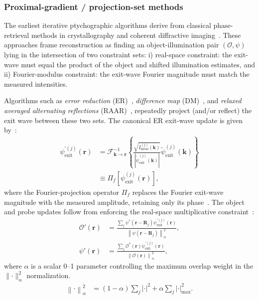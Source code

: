 \documentclass[pdflatex,sn-aps,iicol]{sn-jnl}%
\begin{document}
\subsubsection*{Proximal-gradient / projection-set methods}
\label{sec:projection-methods}

The earliest iterative ptychographic algorithms derive from classical phase-retrieval methods in crystallography and coherent diffractive imaging~\cite{karle1985,Fienup_1982,Levi_1984,Miao_1999,Bauschke_2002,Elser_2003,Thibault_2008}.
These approaches frame reconstruction as finding an object-illumination pair $(\mathcal{O},\psi)$ lying in the intersection of two constraint sets: i) real-space constraint: the exit-wave must equal the product of the object and shifted illumination estimates, and ii) Fourier-modulus constraint: the exit-wave Fourier magnitude must match the measured intensities.

Algorithms such as \emph{error reduction} (ER)~\cite{Levi_1984}, \emph{difference map} (DM)~\cite{Elser_2003,Thibault_2008}, and \emph{relaxed averaged alternating reflections} (RAAR)~\cite{Luke_2004}, repeatedly project (and/or reflect) the exit wave between these two sets.
The canonical ER exit-wave update is given by~\cite{Bauschke_2002}:
\begin{align}
\psi_{\text{exit}}^{'(j)}(\boldsymbol{r})
&=
\mathcal{F}_{\boldsymbol{k}\to\boldsymbol{r}}^{-1}
\left\{
\frac{\sqrt{I_{\text{meas}}^{(j)}(\boldsymbol{k})}}
{\left\lvert \tilde{\psi}_{\text{exit}}^{(j)}(\boldsymbol{k}) \right\rvert}
\tilde{\psi}_{\text{exit}}^{(j)}(\boldsymbol{k})
\right\}
\nonumber\\
&\equiv
\Pi_f\!\left[\psi_{\text{exit}}^{(j)}(\boldsymbol{r})\right],
\label{eq:proj-exit-wave}
\end{align}
where the Fourier-projection operator $\Pi_f$ replaces the Fourier exit-wave magnitude with the measured amplitude, retaining only its phase~\cite{Fienup_1982,Bauschke_2002}.
The object and probe updates follow from enforcing the real-space multiplicative constraint~\cite{Thibault_2008}:
\begin{align}
\mathcal{O}'(\boldsymbol{r})
&=
\frac{
\sum_j
\psi^{*}(\boldsymbol{r}-\boldsymbol{R}_j)
\psi_{\text{exit}}^{'(j)}(\boldsymbol{r})
}{
\left \lVert \psi(\boldsymbol{r}-\boldsymbol{R}_j)\right \rVert^2_{\alpha}},\\
\psi'(\boldsymbol{r})
&=
\frac{
\sum_j
\mathcal{O}^{*}(\boldsymbol{r})
\psi_{\text{exit}}^{'(j)}(\boldsymbol{r})
}{
\left \lVert\mathcal{O}(\boldsymbol{r})\right \rVert^2_{\alpha}
},
\label{eq:proj-update}
\end{align}
where $\alpha$ is a scalar 0--1 parameter controlling the maximum overlap weight in the $\lVert\cdot\rVert^2_{\alpha}$ normalization.
\begin{align}
\left \lVert\cdot \right \rVert ^2_{\alpha}
&=
(1-\alpha)\sum_j \lvert \cdot \rvert^2
+
\alpha \sum_j \lvert \cdot \rvert^2_{\text{max}}.
\label{eq:normalization}
\end{align}
\end{document}
